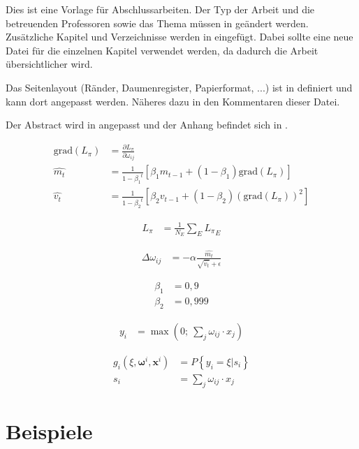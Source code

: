 
Dies ist eine Vorlage für Abschlussarbeiten. Der Typ der Arbeit und die betreuenden Professoren sowie das Thema müssen in  geändert werden. Zusätzliche Kapitel und Verzeichnisse werden in  eingefügt. Dabei sollte eine neue  Datei für die einzelnen Kapitel verwendet werden, da dadurch die Arbeit übersichtlicher wird.

Das Seitenlayout (Ränder, Daumenregister, Papierformat, ...) ist in  definiert und kann dort angepasst werden. Näheres dazu in den Kommentaren dieser Datei.

Der Abstract wird in  angepasst und der Anhang befindet sich in .

\begin{align}
	\text{grad}(L_\pi) &= \frac{\partial L_\pi}{\partial \omega_{ij}} \\
	\hat{m_t} &= \frac{1}{1-{\beta_1}^t} \left[ \beta_1 m_{t-1} + (1 - \beta_1) \text{grad}(L_\pi) \right] \\
	\hat{v_t} &= \frac{1}{1-{\beta_2}^t} \left[ \beta_2 v_{t-1} + (1 - \beta_2) (\text{grad}(L_\pi))^2 \right]
\end{align}

\begin{align}
	L_\pi &= \frac{1}{N_E} \sum_{E} {L_\pi}_E
\end{align}

\begin{align}
	\Delta \omega_{ij} &= - \alpha \frac{\hat{m_t}}{\sqrt{\hat{v_t}} + \epsilon} 
\end{align}

\begin{align}
	\beta_1 &= 0,9 \\
	\beta_2 &= 0,999
\end{align}

\begin{align}
	y_i &= \max \left( 0; ~\sum_j \omega_{ij} \cdot x_j \right)
\end{align}

\begin{align}
	g_i(\xi, \boldsymbol{\omega}^i, \mathbf{x}^i) &= P \left\{ y_i = \xi | s_i \right\} \\
	s_i &= \sum_j \omega_{ij} \cdot x_j
\end{align}


\section{Beispiele}

